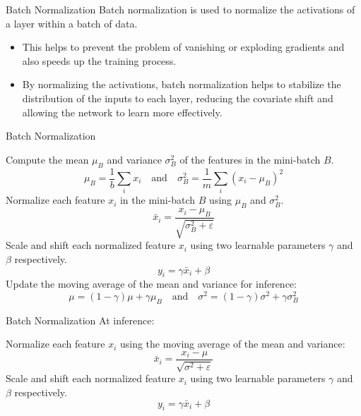 \begin{frame}{}{Batch Normalization}
	Batch normalization is used to normalize the activations of a layer within a batch of data.
	\begin{itemize}
		\item This helps to prevent the problem of vanishing or exploding gradients and also speeds up the training process.
		\item 	By normalizing the activations, batch normalization helps to stabilize the distribution of the inputs to each layer, reducing the covariate shift and allowing the network to learn more effectively.
	\end{itemize}


\end{frame}

\begin{frame}{}{Batch Normalization}
	\begin{small}
		\begin{algorithm}[H]
			\caption{Batch Normalization during training}
			\begin{algorithmic}[1]
				\STATE Compute the mean $\mu_B$ and variance $\sigma_B^2$ of the features in the mini-batch $B$.
				$$\mu_B = \frac{1}{b}\sum_ix_i \quad \mbox{and} \quad\sigma_B^2=\frac{1}{m}\sum_i\left(x_i-\mu_B\right)^2 $$
				\STATE Normalize each feature $x_i$ in the mini-batch $B$ using $\mu_B$ and $\sigma_B^2$.
				$$\bar x_i = \frac{x_i-\mu_B}{\sqrt{\sigma_B^2 + \varepsilon}} $$
				\STATE Scale and shift each normalized feature $x_i$ using two learnable parameters $\gamma$ and $\beta$ respectively.
				$$ y_i = \gamma \bar x_i + \beta $$
				\STATE Update the moving average of the mean and variance for inference:
				$$
					\mu = (1-\gamma)\mu + \gamma \mu_B \quad \mbox{and} \quad \sigma^2 = (1-\gamma)\sigma^2 + \gamma \sigma_B^2 $$
				\ENDFOR
			\end{algorithmic}
		\end{algorithm}
	\end{small}
\end{frame}

\begin{frame}{}{Batch Normalization}
	At inference:
	\begin{algorithm}[H]
		\caption{Batch Normalization at inference}
		\begin{algorithmic}[1]
			\STATE Normalize each feature $x_i$ using the moving average of the mean and variance:
			$$\bar x_i = \frac{x_i-\mu}{\sqrt{\sigma^2 + \varepsilon}} $$
			\STATE Scale and shift each normalized feature $x_i$ using two learnable parameters $\gamma$ and $\beta$ respectively.
			$$ y_i = \gamma \bar x_i + \beta $$
			\ENDFOR
		\end{algorithmic}
	\end{algorithm}
\end{frame}


